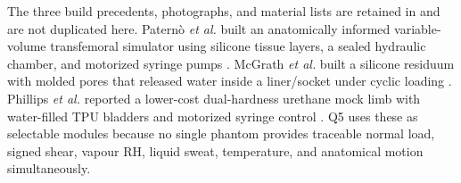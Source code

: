 \clearpage
\hypertarget{q5-phantom}{}


{\fontsize{8.9}{10.45}\selectfont
The three build precedents, photographs, and material lists are retained in
 and are not duplicated
here. Patern\`o \textit{et al.} built an anatomically informed variable-volume
transfemoral simulator using silicone tissue layers, a sealed hydraulic
chamber, and motorized syringe pumps \cite{paterno2025socket}. McGrath
\textit{et al.} built a silicone residuum with molded pores that released
water inside a liner/socket under cyclic loading \cite{mcgrath2021sweat}.
Phillips \textit{et al.} reported a lower-cost dual-hardness urethane mock limb
with water-filled TPU bladders and motorized syringe control
\cite{phillips2025}. Q5 uses these as selectable modules because no single
phantom provides traceable normal load, signed shear, vapour RH, liquid sweat,
temperature, and anatomical motion simultaneously.\par}

